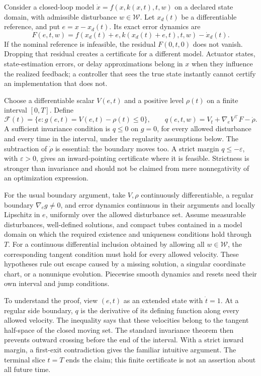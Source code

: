 \documentclass[12pt, openany]{book}
\theoremstyle{plain}
\begin{document}
Consider a closed-loop model $\dot x=f(x,k(x,t),t,w)$ on a declared state domain, with admissible disturbance $w\in\mathcal W$. Let $x_d(t)$ be a differentiable reference, and put $e=x-x_d(t)$. Its exact error dynamics are
\begin{equation}
 F(e,t,w)=f(x_d(t)+e,k(x_d(t)+e,t),t,w)-\dot x_d(t).
 \label{eq:funnel_exact_error}
\end{equation}
If the nominal reference is infeasible, the residual $F(0,t,0)$ does not vanish. Dropping that residual creates a certificate for a different model. Actuator states, state-estimation errors, or delay approximations belong in $x$ when they influence the realized feedback; a controller that sees the true state instantly cannot certify an implementation that does not.

Choose a differentiable scalar $V(e,t)$ and a positive level $\rho(t)$ on a finite interval $[0,T]$. Define
\begin{equation}
 \mathcal F(t)=\{e:g(e,t)=V(e,t)-\rho(t)\leq0\},\qquad
 q(e,t,w)=V_t+\nabla_e V^\top F-\dot\rho.
 \label{eq:funnel_boundary_derivative}
\end{equation}
A sufficient invariance condition is $q\leq0$ on $g=0$, for every allowed disturbance and every time in the interval, under the regularity assumptions below. The subtraction of $\dot\rho$ is essential: the boundary moves too. A strict margin $q\leq-\varepsilon$, with $\varepsilon>0$, gives an inward-pointing certificate where it is feasible. Strictness is stronger than invariance and should not be claimed from mere nonnegativity of an optimization expression.

For the usual boundary argument, take $V,\rho$ continuously differentiable, a regular boundary $\nabla_e g\neq0$, and error dynamics continuous in their arguments and locally Lipschitz in $e$, uniformly over the allowed disturbance set. Assume measurable disturbances, well-defined solutions, and compact tubes contained in a model domain on which the required existence and uniqueness conditions hold through $T$. For a continuous differential inclusion obtained by allowing all $w\in\mathcal W$, the corresponding tangent condition must hold for every allowed velocity. These hypotheses rule out escape caused by a missing solution, a singular coordinate chart, or a nonunique evolution. Piecewise smooth dynamics and resets need their own interval and jump conditions.

To understand the proof, view $(e,t)$ as an extended state with $\dot t=1$. At a regular side boundary, $q$ is the derivative of its defining function along every allowed velocity. The inequality says that these velocities belong to the tangent half-space of the closed moving set. The standard invariance theorem then prevents outward crossing before the end of the interval. With a strict inward margin, a first-exit contradiction gives the familiar intuitive argument. The terminal slice $t=T$ ends the claim; this finite certificate is not an assertion about all future time.
\end{document}

